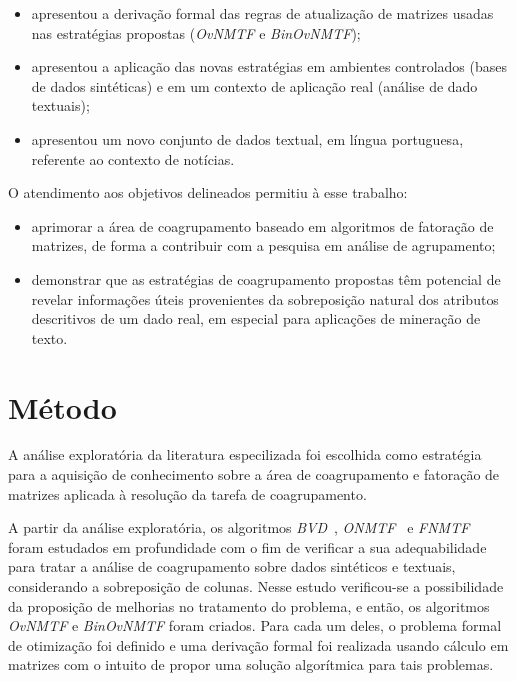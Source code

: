 \documentclass[
    12pt,                %
    oneside,            %
    a4paper,            %
    english,            %
    brazil                %
    ]{abntex2ppgsi}
\begin{document}
\begin{itemize}
\item apresentou a derivação formal das regras de atualização de matrizes usadas nas estratégias propostas (\textit{OvNMTF} e \textit{BinOvNMTF});
\item apresentou a aplicação das novas estratégias em ambientes controlados (bases de dados sintéticas) e em um contexto de aplicação real (análise de dado textuais);
\item apresentou um novo conjunto de dados textual, em língua portuguesa, referente ao contexto de notícias.
\end{itemize}

O atendimento aos objetivos delineados permitiu à esse trabalho:

\begin{itemize}
\item aprimorar a área de coagrupamento baseado em algoritmos de fatoração de matrizes, de forma a contribuir com a pesquisa em análise de agrupamento;
\item demonstrar que as estratégias de coagrupamento propostas têm potencial de revelar informações úteis provenientes da sobreposição natural dos atributos descritivos de um dado real, em especial para aplicações de mineração de texto.
\end{itemize}


\section{Método}

A análise exploratória da literatura especilizada foi escolhida como estratégia para a aquisição de conhecimento sobre a área de coagrupamento e fatoração de matrizes aplicada à resolução da tarefa de coagrupamento.

A partir da análise exploratória, os algoritmos \textit{BVD}~\cite{Long2005}, \textit{ONMTF}~\cite{Ding06,Yoo2010} e \textit{FNMTF}~\cite{Wang2011} foram estudados em profundidade com o fim de verificar a sua adequabilidade para tratar a análise de coagrupamento sobre dados sintéticos e textuais, considerando a sobreposição de colunas.
Nesse estudo verificou-se a possibilidade da proposição de melhorias no tratamento do problema, e então, os algoritmos \textit{OvNMTF} e \textit{BinOvNMTF} foram criados.
Para cada um deles, o problema formal de otimização foi definido e uma derivação formal foi realizada usando cálculo em matrizes com o intuito de propor uma solução algorítmica para tais problemas.
\end{document}
